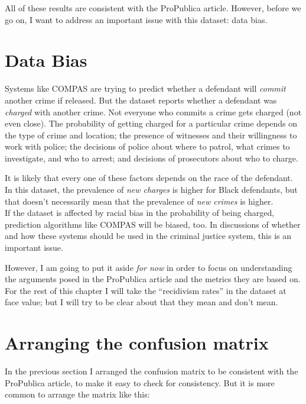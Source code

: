 All of these results are consistent with the ProPublica article.
However, before we go on, I want to address an important issue with this
dataset: data bias.

\section{Data Bias}\label{data-bias}

Systems like COMPAS are trying to predict whether a defendant will
\emph{commit} another crime if released. But the dataset reports whether
a defendant was \emph{charged} with another crime. Not everyone who
commits a crime gets charged (not even close). The probability of
getting charged for a particular crime depends on the type of crime and
location; the presence of witnesses and their willingness to work with
police; the decisions of police about where to patrol, what crimes to
investigate, and who to arrest; and decisions of prosecutors about who
to charge.

It is likely that every one of these factors depends on the race of the
defendant. In this dataset, the prevalence of \emph{new charges} is
higher for Black defendants, but that doesn't necessarily mean that the
prevalence of \emph{new crimes} is higher.\\
If the dataset is affected by racial bias in the probability of being
charged, prediction algorithms like COMPAS will be biased, too. In
discussions of whether and how these systems should be used in the
criminal justice system, this is an important issue.

However, I am going to put it aside \emph{for now} in order to focus on
understanding the arguments posed in the ProPublica article and the
metrics they are based on. For the rest of this chapter I will take the
``recidivism rates'' in the dataset at face value; but I will try to be
clear about that they mean and don't mean.

\section{Arranging the confusion
matrix}\label{arranging-the-confusion-matrix}

In the previous section I arranged the confusion matrix to be consistent
with the ProPublica article, to make it easy to check for consistency.
But it is more common to arrange the matrix like this:

